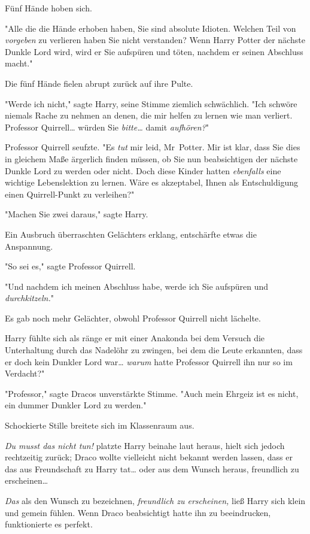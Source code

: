 {Fünf Hände hoben sich.

"Alle die die Hände erhoben haben, Sie sind absolute Idioten. Welchen Teil von \emph{vorgeben} zu verlieren haben Sie nicht verstanden? Wenn Harry Potter der nächste Dunkle Lord wird, wird er Sie aufspüren und töten, nachdem er seinen Abschluss macht."

Die fünf Hände fielen abrupt zurück auf ihre Pulte.

"Werde ich nicht," sagte Harry, seine Stimme ziemlich schwächlich. "Ich schwöre niemals Rache zu nehmen an denen, die mir helfen zu lernen wie man verliert. Professor Quirrell… würden Sie \emph{bitte…} damit \emph{aufhören?}"

Professor Quirrell seufzte. "Es \emph{tut} mir leid, Mr~Potter. Mir ist klar, dass Sie dies in gleichem Maße ärgerlich finden müssen, ob Sie nun beabsichtigen der nächste Dunkle Lord zu werden oder nicht. Doch diese Kinder hatten \emph{ebenfalls} eine wichtige Lebenslektion zu lernen. Wäre es akzeptabel, Ihnen als Entschuldigung einen Quirrell-Punkt zu verleihen?"

"Machen Sie zwei daraus," sagte Harry.

Ein Ausbruch überraschten Gelächters erklang, entschärfte etwas die Anspannung.

"So sei es," sagte Professor Quirrell.

"Und nachdem ich meinen Abschluss habe, werde ich Sie aufspüren und \emph{durchkitzeln.}"

Es gab noch mehr Gelächter, obwohl Professor Quirrell nicht lächelte.

Harry fühlte sich als ränge er mit einer Anakonda bei dem Versuch die Unterhaltung durch das Nadelöhr zu zwingen, bei dem die Leute erkannten, dass er doch kein Dunkler Lord war… \emph{warum} hatte Professor Quirrell ihn nur so im Verdacht?"

"Professor," sagte Dracos unverstärkte Stimme. "Auch mein Ehrgeiz ist es nicht, ein dummer Dunkler Lord zu werden."

Schockierte Stille breitete sich im Klassenraum aus.

\emph{Du musst das nicht tun!} platzte Harry beinahe laut heraus, hielt sich jedoch rechtzeitig zurück; Draco wollte vielleicht nicht bekannt werden lassen, dass er das aus Freundschaft zu Harry tat… oder aus dem Wunsch heraus, freundlich zu erscheinen…

\emph{Das} als den Wunsch zu bezeichnen, \emph{freundlich zu erscheinen,} ließ Harry sich klein und gemein fühlen. Wenn Draco beabsichtigt hatte ihn zu beeindrucken, funktionierte es perfekt.

}
